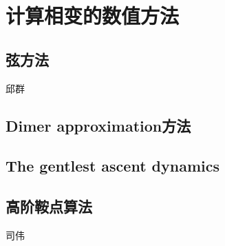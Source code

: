 \section{计算相变的数值方法}

\subsection{弦方法}
{\color{red}\begin{center}
     邱群
\end{center}}

\subsection{Dimer approximation方法}

\subsection{The gentlest ascent dynamics}


\subsection{高阶鞍点算法}
{\color{red}\begin{center}
    司伟
\end{center}}

